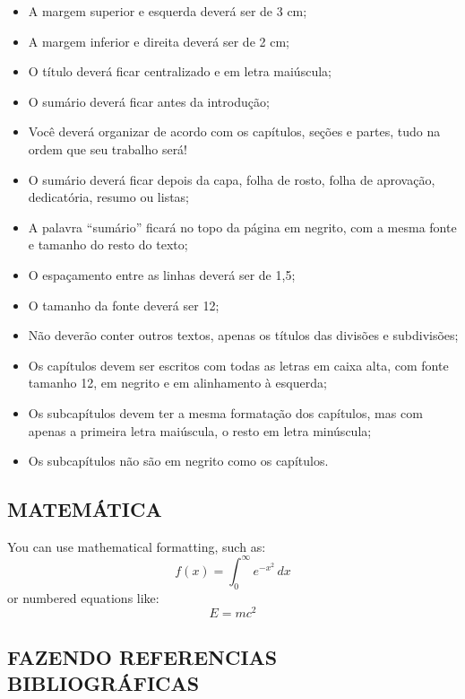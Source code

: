 \begin{itemize}
    \item A margem superior e esquerda deverá ser de 3 cm;
    \item A margem inferior e direita deverá ser de 2 cm;
    \item O título deverá ficar centralizado e em letra maiúscula;
    \item O sumário deverá ficar antes da introdução;
    \item Você deverá organizar de acordo com os capítulos, seções e partes, tudo na ordem que seu trabalho será!
    \item O sumário deverá ficar depois da capa, folha de rosto, folha de aprovação, dedicatória, resumo ou listas;
    \item A palavra “sumário” ficará no topo da página em negrito, com a mesma fonte e tamanho do resto do texto;
    \item O espaçamento entre as linhas deverá ser de 1,5;
    \item O tamanho da fonte deverá ser 12;
    \item Não deverão conter outros textos, apenas os títulos das divisões e subdivisões;
    \item Os capítulos devem ser escritos com todas as letras em caixa alta, com fonte tamanho 12, em negrito e em alinhamento à esquerda;
    \item Os subcapítulos devem ter a mesma formatação dos capítulos, mas com apenas a primeira letra maiúscula, o resto em letra minúscula;
    \item Os subcapítulos não são em negrito como os capítulos.
\end{itemize}

\newpage

\subsection{MATEMÁTICA}

You can use mathematical formatting, such as:
\[
f(x) = \int_{0}^{\infty} e^{-x^2} \, dx
\]
or numbered equations like:
\begin{equation}
    E = mc^2
\end{equation}

\subsection{FAZENDO REFERENCIAS BIBLIOGRÁFICAS}


